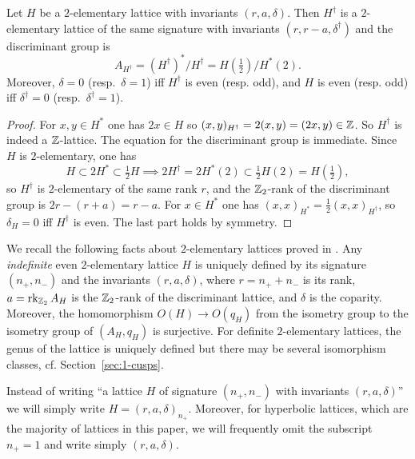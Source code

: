 \documentclass{amsart}
\begin{document}
\begin{lemma}\label{lem:doubled-dual} 
  Let $H$ be a $2$-elementary lattice with invariants
  $(r,a,\delta)$. Then $H^\dag$ is a $2$-elementary lattice of the
  same signature with 
  invariants $(r,r-a,\delta^\dag)$ and the discriminant group is
  \begin{displaymath}\label{eq:discr-doubled-dual}
    A_{H^\dag} = (H^\dag)^* / H^\dag = H(\tfrac12) / H^*(2).
  \end{displaymath}
  Moreover, $\delta=0$ (resp.~$\delta=1$) iff $H^\dag$ is even (resp. odd),
  and $H$ is even (resp. odd) iff $\delta^\dag=0$ (resp.~$\delta^\dag=1$).
\end{lemma}
\begin{proof}
  For $x,y\in H^*$ one has $2x\in H$ so
  $(x,y)_{H^\dag} = 2(x,y) = (2x,y)\in{\mathbb Z}$. So $H^\dag$ is indeed a
  ${\mathbb Z}$-lattice. The equation for the discriminant group is immediate.
  Since $H$ is $2$-elementary, one has
  \begin{displaymath}
    H\subset 2H^*\subset \tfrac12 H    \implies
    2H^\dag = 2H^*(2) \subset \tfrac12 H(2) = H(\tfrac12),
  \end{displaymath}
  so $H^\dag$ is $2$-elementary of the same rank $r$, and the
  ${\mathbb Z}_2$-rank of the discriminant group is $2r-(r+a) = r-a$. 
  For $x\in H^*$ one has $(x,x)_{H^*} = \frac12 (x,x)_{H^\dag}$, so
  $\delta_H=0$ iff $H^\dag$ is even. The last part holds by symmetry.
\end{proof}



We recall the following facts about $2$-elementary lattices proved in
\cite{nikulin1979integer-symmetric}. Any \emph{indefinite} even
$2$-elementary lattice $H$ is uniquely defined by its signature
$(n_+,n_-)$ and the invariants $(r,a,\delta)$, where $r=n_++n_-$ is
its rank, $a = \operatorname{rk}_{{\mathbb Z}_2} A_H$ is the ${\mathbb Z}_2$-rank of the discriminant
lattice, and $\delta$ is the coparity.  Moreover, the homomorphism
$O(H) \to O(q_H)$ from the isometry group to the isometry group of
$(A_H,q_H)$ is surjective. For definite $2$-elementary lattices,
the genus of the lattice is uniquely defined but there may be several
isomorphism
classes, cf. Section~\ref{sec:1-cusps}.

\begin{notation}
  Instead of writing ``a lattice $H$ of signature $(n_+,n_-)$ with
  invariants $(r,a,\delta)$'' we will simply write
  $H=(r,a,\delta)_{n_+}$. Moreover, for hyperbolic lattices, which are
  the majority of lattices in this paper, we will frequently omit the
  subscript $n_+=1$ and write simply $(r,a,\delta)$.
\end{notation}
\end{document}
